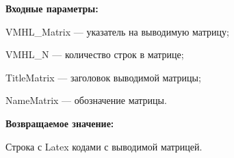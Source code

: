 \textbf{Входные параметры:}

    VMHL\_Matrix --- указатель на выводимую матрицу;
 
    VMHL\_N --- количество строк в матрице;
 
    TitleMatrix --- заголовок выводимой матрицы;
 
    NameMatrix --- обозначение матрицы.
	
\textbf{Возвращаемое значение:}

Строка с Latex кодами с выводимой матрицей.